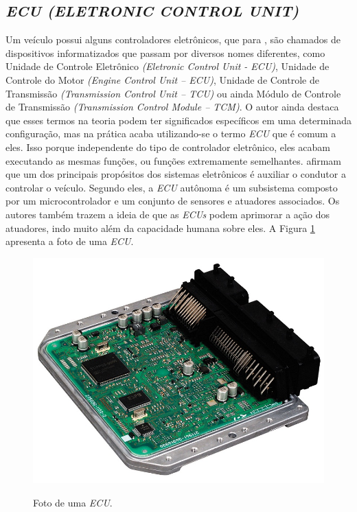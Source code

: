 \subsection{\textit{ECU (ELETRONIC CONTROL UNIT)}}
Um veículo possui alguns controladores eletrônicos, que para , são chamados de dispositivos informatizados que passam por diversos nomes diferentes, como Unidade de Controle Eletrônico \textit{(Eletronic Control Unit - ECU)}, Unidade de Controle do Motor \textit{(Engine Control Unit – ECU)}, Unidade de Controle de Transmissão \textit{(Transmission Control Unit – TCU)} ou ainda Módulo de Controle de Transmissão \textit{(Transmission Control Module – TCM)}. O autor ainda destaca que esses termos na teoria podem ter significados específicos em uma determinada configuração, mas na prática acaba utilizando-se o termo \textit{ECU} que é comum a eles. Isso porque independente do tipo de controlador eletrônico, eles acabam executando as mesmas funções, ou funções extremamente semelhantes.  afirmam que um dos principais propósitos dos sistemas eletrônicos é auxiliar o condutor a controlar o veículo. Segundo eles, a \textit{ECU} autônoma é um subsistema composto por um microcontrolador e um conjunto de sensores e atuadores associados. Os autores também trazem a ideia de que as \textit{ECUs} podem aprimorar a ação dos atuadores, indo muito além da capacidade humana sobre eles. A Figura \ref{Fig:ecu} apresenta a foto de uma \textit{ECU}.

\begin{figure}[!ht]
\centering
\caption{Foto de uma \textit{ECU}.} 
{\includegraphics[scale=1.3]{imagens/ecu1.jpg}}\\
 \label{Fig:ecu}
\end{figure}

